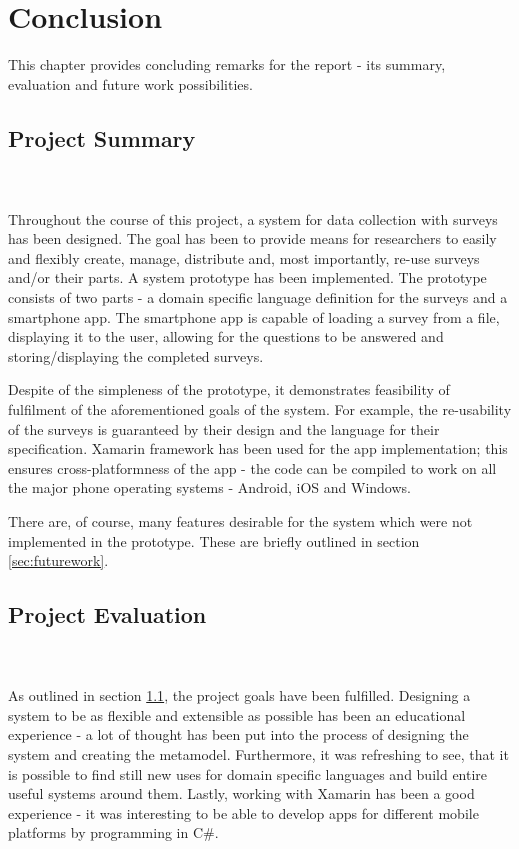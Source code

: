 \chapter{Conclusion}
\label{chap:conclusion}
This chapter provides concluding remarks for the report - its summary, evaluation and future work possibilities.

\section{Project Summary}
\label{sec:summary}
\pawel \\\\
Throughout the course of this project, a system for data collection with surveys has been designed. The goal has been to provide means for researchers to easily and flexibly create, manage, distribute and, most importantly, re-use surveys and/or their parts. 
A system prototype has been implemented. The prototype consists of two parts - a domain specific language definition for the surveys and a smartphone app. The smartphone app is capable of loading a survey from a file, displaying it to the user, allowing for the questions to be answered and storing/displaying the completed surveys.

Despite of the simpleness of the prototype, it demonstrates feasibility of fulfilment of the aforementioned goals of the system. For example, the re-usability of the surveys is guaranteed by their design and the language for their specification. Xamarin framework has been used for the app implementation; this ensures cross-platformness of the app - the code can be compiled to work on all the major phone operating systems - Android, iOS and Windows.

There are, of course, many features desirable for the system which were not implemented in the prototype. These are briefly outlined in section \ref{sec:futurework}.

\section{Project Evaluation}
\label{sec:evaluation}
\anna \\\\
As outlined in section \ref{sec:summary}, the project goals have been fulfilled. Designing a system to be as flexible and extensible as possible has been an educational experience - a lot of thought has been put into the process of designing the system and creating the metamodel. Furthermore, it was refreshing to see, that it is possible to find still new uses for domain specific languages and build entire useful systems around them. Lastly, working with Xamarin has been a good experience - it was interesting to be able to develop apps for different mobile platforms by programming in C\#.

